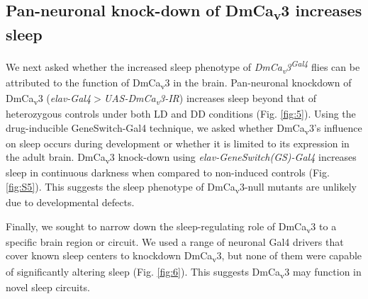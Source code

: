 \subsection*{Pan-neuronal knock-down of DmCa\textsubscript{v}3 increases sleep}

We next asked whether the increased sleep phenotype of \emph{DmCa\textsubscript{v}3\textsuperscript{Gal4}} flies can be attributed to the function of DmCa\textsubscript{v}3 in the brain.
Pan-neuronal knockdown of DmCa\textsubscript{v}3 (\emph{elav-Gal4$>$UAS-DmCa\textsubscript{v}3-IR}) increases sleep beyond that of heterozygous controls under both LD and DD conditions (Fig. \ref{fig:5}).
Using the drug-inducible GeneSwitch-Gal4 technique\cite{Osterwalder:2001cl}, we asked whether DmCa\textsubscript{v}3's influence on sleep occurs during development or whether it is limited to its expression in the adult brain.
DmCa\textsubscript{v}3 knock-down using \emph{elav-GeneSwitch(GS)-Gal4} increases sleep in continuous darkness when compared to non-induced controls (Fig.\ref{fig:S5}).
This suggests the sleep phenotype of DmCa\textsubscript{v}3-null mutants are unlikely due to developmental defects.

Finally, we sought to narrow down the sleep-regulating role of DmCa\textsubscript{v}3 to a specific brain region or circuit.
We used a range of neuronal Gal4 drivers that cover known sleep centers to knockdown DmCa\textsubscript{v}3, but none of them were capable of significantly altering sleep (Fig. \ref{fig:6}).
This suggests DmCa\textsubscript{v}3 may function in novel sleep circuits.
